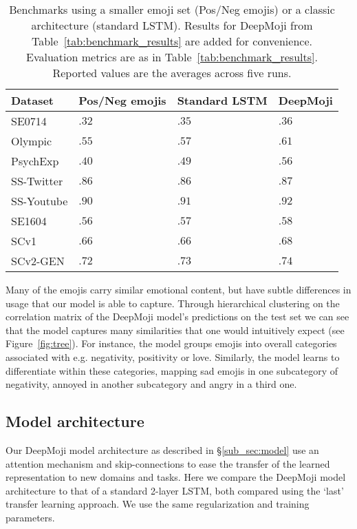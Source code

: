 \documentclass[11pt,a4paper]{article}
\begin{document}
\begin{table}[h]
\centering
\small
\caption{Benchmarks using a smaller emoji set (Pos/Neg emojis) or a classic architecture (standard LSTM). Results for DeepMoji from Table~\ref{tab:benchmark_results} are added for convenience. Evaluation metrics are as in Table~\ref{tab:benchmark_results}. Reported values are the averages across five runs.}
\label{tab:reduced_emojis}
\begin{center}
\begin{tabular}{L{1.9cm}C{1.3cm}C{1.3cm}C{1.3cm}}
\toprule
Dataset & Pos/Neg emojis & Standard LSTM & DeepMoji \\
 \midrule
  SE0714  & $.32$ & $.35$ & $.36$ \\ Olympic  & $.55$ & $.57$ & $.61$ \\ PsychExp  & $.40$ & $.49$ & $.56$ \\ \midrule
 SS-Twitter  & $.86$ & $.86$ & $.87$ \\ SS-Youtube  & $.90$ & $.91$ & $.92$ \\ SE1604  & $.56$ & $.57$ & $.58$ \\ \midrule
 SCv1 & $.66$ & $.66$ & $.68$ \\ SCv2-GEN & $.72$ & $.73$ & $.74$ \\ \bottomrule
\end{tabular}
\end{center}
\end{table}


Many of the emojis carry similar emotional content, but have subtle differences in usage that our model is able to capture. Through hierarchical clustering on the correlation matrix of the DeepMoji model's predictions on the test set we can see that the model captures many similarities that one would intuitively expect (see Figure~\ref{fig:tree}). For instance, the model groups emojis into overall categories associated with e.g. negativity, positivity or love. Similarly, the model learns to differentiate within these categories, mapping sad emojis in one subcategory of negativity, annoyed in another subcategory and angry in a third one. 

\subsection{Model architecture}
\label{sub_sec:analysis_model_architecture}

Our DeepMoji model architecture as described in \S\ref{sub_sec:model} use an attention mechanism and skip-connections to ease the transfer of the learned representation to new domains and tasks. Here we compare the DeepMoji model architecture to that of a standard 2-layer LSTM, both compared using the `last' transfer learning approach. We use the same regularization and training parameters.
\end{document}
